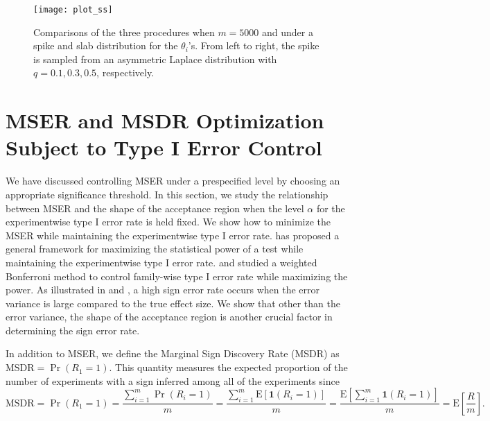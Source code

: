 \documentclass[11pt]{article}
\newcommand{\Exp}[1]{{\text{E}}[ \ensuremath{ #1 } ]  }
\begin{document}
\begin{figure}[!h]
	\centering
	\texttt{[image: plot\_ss]}
	\caption{Comparisons of the three procedures when $m=5000$ and under a spike and slab distribution for the $\theta_i$'s. From left to right, the spike is sampled from an asymmetric Laplace distribution with $q = 0.1, 0.3, 0.5$, respectively. %
}
	\label{fig:ss}
\end{figure}






\section{MSER and MSDR Optimization Subject to Type I Error Control}
We have discussed controlling MSER under a prespecified level by choosing an appropriate significance threshold. In this section, we study the relationship between MSER and the shape of the acceptance region when the level $\alpha$ for the experimentwise type I error rate is held fixed.  We show how to minimize the MSER while maintaining the experimentwise type I error rate. \citet{storey2007optimal} has proposed a general framework for maximizing the statistical power of a test while maintaining the experimentwise type I error rate. \citet{wasserman2006weighted} and \citet{Dobriban2015} studied a weighted Bonferroni method to control family-wise type I error rate while maximizing the power.  As illustrated in \citet{gelman2014beyond} and  \citet{owen2016confidence}, a high sign error rate occurs when the error variance is large compared to the true effect size. We show that other than the error variance, the shape of the acceptance region is another crucial factor in determining the sign error rate.

In addition to MSER, we define the Marginal Sign Discovery Rate (MSDR) as $
	\text{MSDR} = \Pr(R_1 = 1)$.
This quantity measures the expected proportion of the number of experiments with a sign inferred among all of the experiments since 
\begin{equation*}
	\text{MSDR} = \Pr(R_1 = 1) =   \frac{\sum_{i=1}^{m} \Pr(R_i=1)}{m} = \frac{\sum_{i=1}^{m} \Exp{\textbf{1}(R_i=1)}}{m} =  \frac{\Exp{\sum_{i=1}^{m} \textbf{1}(R_i=1)}}{m} = \text{E}\left[ \frac{R}{m} \right].
\end{equation*}
\end{document}
